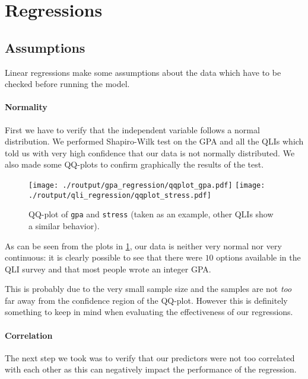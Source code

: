 \documentclass[11pt]{extarticle}
\numberwithin{table}{section}
\numberwithin{figure}{section}
\numberwithin{equation}{section}
\begin{document}
\section{Regressions}

\subsection{Assumptions}

Linear regressions make some assumptions about the data which have to be checked before
running the model.

\paragraph{Normality}
First we have to verify that the independent variable follows a normal distribution.
We performed Shapiro-Wilk test on the GPA and all the QLIs which told us
with very high confidence that our data is not normally distributed.
We also made some QQ-plots to confirm graphically the results of the test.

\begin{figure}[!ht]
	\centering
	{\texttt{[image: ./routput/gpa\_regression/qqplot\_gpa.pdf]}}
	\hspace{1cm}
	{\texttt{[image: ./routput/qli\_regression/qqplot\_stress.pdf]}}
	\caption{QQ-plot of \texttt{gpa} and \texttt{stress}
		(taken as an example, other QLIs show a similar behavior).
	}
	\label{fig:qq-gpa-stress}
\end{figure}

As can be seen from the plots in \cref{fig:qq-gpa-stress},
our data is neither very normal nor very continuous:
it is clearly possible to see that there were $10$ options available in the QLI survey
and that most people wrote an integer GPA.

This is probably due to the very small sample size
and the samples are not \textit{too} far away from the confidence region of the QQ-plot.
However this is definitely something to keep in mind when
evaluating the effectiveness of our regressions.

\paragraph{Correlation}
The next step we took was to verify that our predictors
were not too correlated with each other as this can negatively impact the performance
of the regression.
\end{document}
